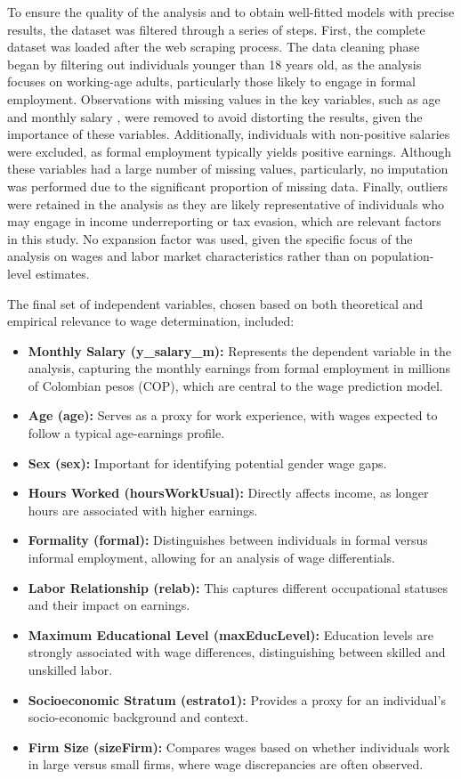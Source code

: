 \documentclass[11pt,a4paper,onecolumn]{article}
\begin{document}
    To ensure the quality of the analysis and to obtain well-fitted models with precise results, the dataset was filtered through a series of steps. First, the complete dataset was loaded after the web scraping process. The data cleaning phase began by filtering out individuals younger than 18 years old, as the analysis focuses on working-age adults, particularly those likely to engage in formal employment. Observations with missing values in the key variables, such as age and monthly salary , were removed to avoid distorting the results, given the importance of these variables. Additionally, individuals with non-positive salaries were excluded, as formal employment typically yields positive earnings. Although these variables had a large number of missing values, particularly, no imputation was performed due to the significant proportion of missing data. Finally, outliers were retained in the analysis as they are likely representative of individuals who may engage in income underreporting or tax evasion, which are relevant factors in this study. No expansion factor was used, given the specific focus of the analysis on wages and labor market characteristics rather than on population-level estimates.
    
    The final set of independent variables, chosen based on both theoretical and empirical relevance to wage determination, included:
    
    \begin{itemize}
        \item \textbf{Monthly Salary (y\_salary\_m):} Represents the dependent variable in the analysis, capturing the monthly earnings from formal employment in millions of Colombian pesos (COP), which are central to the wage prediction model.
        \item \textbf{Age (age):} Serves as a proxy for work experience, with wages expected to follow a typical age-earnings profile.
        \item \textbf{Sex (sex):} Important for identifying potential gender wage gaps.
        \item \textbf{Hours Worked (hoursWorkUsual):} Directly affects income, as longer hours are associated with higher earnings.
        \item \textbf{Formality (formal):} Distinguishes between individuals in formal versus informal employment, allowing for an analysis of wage differentials.
        \item \textbf{Labor Relationship (relab):} This captures different occupational statuses and their impact on earnings.
        \item \textbf{Maximum Educational Level (maxEducLevel):} Education levels are strongly associated with wage differences, distinguishing between skilled and unskilled labor.
        \item \textbf{Socioeconomic Stratum (estrato1):} Provides a proxy for an individual’s socio-economic background and context.
        \item \textbf{Firm Size (sizeFirm):} Compares wages based on whether individuals work in large versus small firms, where wage discrepancies are often observed.
    \end{itemize}
\end{document}
